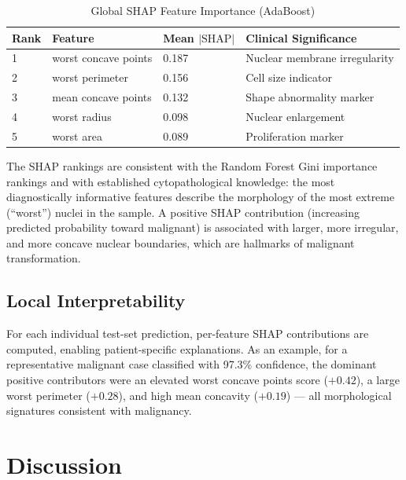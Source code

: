 \documentclass[10pt,letterpaper]{article}
\begin{document}
\begin{table}[h]
\centering
\caption{Global SHAP Feature Importance (AdaBoost)}
\label{tab:shap}
\begin{tabular}{lllp{5cm}}
\toprule
\textbf{Rank} & \textbf{Feature} & \textbf{Mean $|\text{SHAP}|$} & \textbf{Clinical Significance} \\
\midrule
1 & worst concave points  & 0.187 & Nuclear membrane irregularity \\
2 & worst perimeter       & 0.156 & Cell size indicator \\
3 & mean concave points   & 0.132 & Shape abnormality marker \\
4 & worst radius          & 0.098 & Nuclear enlargement \\
5 & worst area            & 0.089 & Proliferation marker \\
\bottomrule
\end{tabular}
\end{table}

The SHAP rankings are consistent with the Random Forest Gini importance rankings and with
established cytopathological knowledge: the most diagnostically informative features describe the
morphology of the most extreme (``worst'') nuclei in the sample. A positive SHAP contribution
(increasing predicted probability toward malignant) is associated with larger, more irregular,
and more concave nuclear boundaries, which are hallmarks of malignant transformation.

\subsection{Local Interpretability}

For each individual test-set prediction, per-feature SHAP contributions are computed, enabling
patient-specific explanations. As an example, for a representative malignant case classified with
97.3\% confidence, the dominant positive contributors were an elevated worst concave points score
($+0.42$), a large worst perimeter ($+0.28$), and high mean concavity ($+0.19$) --- all
morphological signatures consistent with malignancy.

\section{Discussion}
\end{document}
